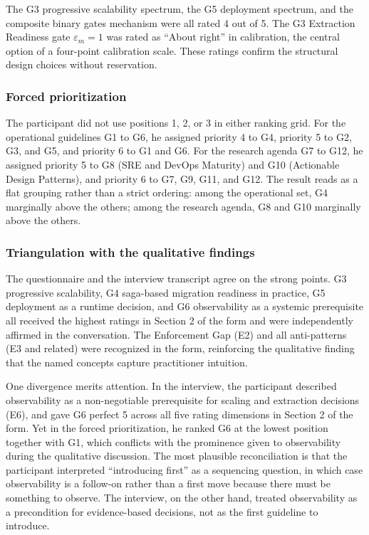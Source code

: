 The G3 progressive scalability spectrum, the G5 deployment spectrum, and the composite binary gates mechanism were all rated 4 out of 5. The G3 Extraction Readiness gate $\varepsilon_m = 1$ was rated as ``About right'' in calibration, the central option of a four-point calibration scale. These ratings confirm the structural design choices without reservation.

\subsubsection*{Forced prioritization}

The participant did not use positions 1, 2, or 3 in either ranking grid. For the operational guidelines G1 to G6, he assigned priority 4 to G4, priority 5 to G2, G3, and G5, and priority 6 to G1 and G6. For the research agenda G7 to G12, he assigned priority 5 to G8 (SRE and DevOps Maturity) and G10 (Actionable Design Patterns), and priority 6 to G7, G9, G11, and G12. The result reads as a flat grouping rather than a strict ordering: among the operational set, G4 marginally above the others; among the research agenda, G8 and G10 marginally above the others.

\subsubsection*{Triangulation with the qualitative findings}

The questionnaire and the interview transcript agree on the strong points. G3 progressive scalability, G4 saga-based migration readiness in practice, G5 deployment as a runtime decision, and G6 observability as a systemic prerequisite all received the highest ratings in Section 2 of the form and were independently affirmed in the conversation. The Enforcement Gap (E2) and all anti-patterns (E3 and related) were recognized in the form, reinforcing the qualitative finding that the named concepts capture practitioner intuition.

One divergence merits attention. In the interview, the participant described observability as a non-negotiable prerequisite for scaling and extraction decisions (E6), and gave G6 perfect 5 across all five rating dimensions in Section 2 of the form. Yet in the forced prioritization, he ranked G6 at the lowest position together with G1, which conflicts with the prominence given to observability during the qualitative discussion. The most plausible reconciliation is that the participant interpreted ``introducing first'' as a sequencing question, in which case observability is a follow-on rather than a first move because there must be something to observe. The interview, on the other hand, treated observability as a precondition for evidence-based decisions, not as the first guideline to introduce.


